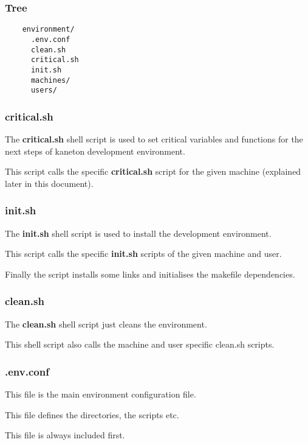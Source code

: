 
\begin{frame}[containsverbatim]
  \frametitle{Tree}

  \begin{verbatim}
    environment/
      .env.conf
      clean.sh
      critical.sh
      init.sh
      machines/
      users/
  \end{verbatim}
\end{frame}


\begin{frame}
  \frametitle{critical.sh}

  The \textbf{critical.sh} shell script is used to set critical variables and
  functions for the next steps of kaneton development environment.

  \nl

  This script calls the specific \textbf{critical.sh} script for the given
  machine (explained later in this document).

\end{frame}


\begin{frame}
  \frametitle{init.sh}

  The \textbf{init.sh} shell script is used to install the development
  environment.

  \nl

  This script calls the specific \textbf{init.sh} scripts of the given
  machine and user.

  \nl

  Finally the script installs some links and initialises the makefile
  dependencies.
\end{frame}


\begin{frame}
  \frametitle{clean.sh}

  The \textbf{clean.sh} shell script just cleans the environment.

  \nl

  This shell script also calls the machine and user specific clean.sh scripts.
\end{frame}


\begin{frame}
  \frametitle{.env.conf}

  This file is the main environment configuration file.

  \nl

  This file defines the directories, the scripts etc.

  \nl

  This file is always included first.
\end{frame}

